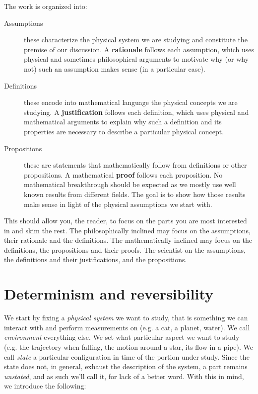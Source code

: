 \documentclass[aps,pra,10pt,twocolumn,floatfix,nofootinbib]{revtex4-1}
\theoremstyle{definition}
\begin{document}
The work is organized into:
\begin{description}
  \item[Assumptions] these characterize the physical system we are studying and constitute the premise of our discussion. A \textbf{rationale} follows each assumption, which uses physical and sometimes philosophical arguments to motivate why (or why not) such an assumption makes sense (in a particular case).
  \item[Definitions] these encode into mathematical language the physical concepts we are studying. A \textbf{justification} follows each definition, which uses physical and mathematical arguments to explain why such a definition and its properties are necessary to describe a particular physical concept.
  \item[Propositions] these are statements that mathematically follow from definitions or other propositions. A mathematical \textbf{proof} follows each proposition. No mathematical breakthrough should be expected as we mostly use well known results from different fields. The goal is to show how those results make sense in light of the physical assumptions we start with.
\end{description}
This should allow you, the reader, to focus on the parts you are most interested in and skim the rest. The philosophically inclined may focus on the assumptions, their rationale and the definitions. The mathematically inclined may focus on the definitions, the propositions and their proofs. The scientist on the assumptions, the definitions and their justifications, and the propositions.

\section{Determinism and reversibility}


We start by fixing a \emph{physical system} we want to study, that is something we can interact with and perform measurements on (e.g. a cat, a planet, water). We call \emph{environment} everything else. We set what particular aspect we want to study (e.g. the trajectory when falling, the motion around a star, its flow in a pipe). We call \emph{state} a particular configuration in time of the portion under study. Since the state does not, in general, exhaust the description of the system, a part remains \emph{unstated}, and as such we'll call it, for lack of a better word. With this in mind, we introduce the following:
\end{document}
